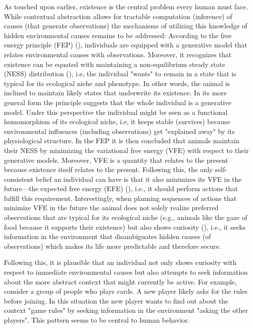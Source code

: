 As touched upon earlier, existence is the central problem every human must face. While contextual abstraction allows for tractable computation (inference) of causes (that generate observations) the mechanisms of utilizing this knowledge of hidden environmental causes remains to be addressed: According to the free energy principle (FEP) (\cite{friston2010}), individuals are equipped with a generative model that relates environmental causes with observations. Moreover, it recognizes that existence can be equated with maintaining a non-equilibrium steady state (NESS) distribution (\cite{friston2013}), i.e, the individual "wants" to remain in a state that is typical for its ecological niche and phenotype. In other words, the animal is inclined to maintain likely states that underwrite its existence. In its more general form the principle suggests that the whole individual is a generative model. Under this perspective the individual might be seen as a functional homomorphism of its ecological niche, i.e, it keeps stable (survives) because environmental influences (including observations) get "explained away" by its physiological structure. In the FEP it is then concluded that animals maintain their NESS by minimizing the variational free energy (VFE) with respect to their generative models. Moreover, VFE is a quantity that relates to the present because existence itself relates to the present. Following this, the only self-consistent belief an individual can have is that it also minimizes its VFE in the future---the expected free energy (EFE) (\cite{friston2015}), i.e., it should perform actions that fulfill this requirement. Interestingly, when planning sequences of actions that minimize VFE in the future the animal does not solely realize preferred observations that are typical for its ecological niche (e.g., animals like the gaze of food because it supports their existence) but also shows curiosity (\cite{friston2015}), i.e., it seeks information in the environment that disambiguates hidden causes (of observations) which makes its life more predictable and therefore secure.

Following this, it is plausible that an individual not only shows curiosity with respect to immediate environmental causes but also attempts to seek information about the more abstract context that might currently be active. For example, consider a group of people who plays cards. A new player likely asks for the rules before joining. In this situation the new player wants to find out about the context "game rules" by seeking information in the environment "asking the other players". This pattern seems to be central to human behavior.

